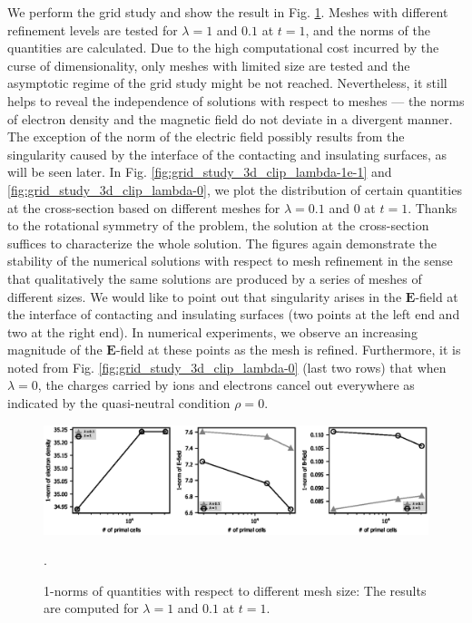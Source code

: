 \documentclass{article}
\begin{document}
We perform the grid study and show the result in Fig. \ref{fig:grid_study_3d}. Meshes with different refinement levels are tested for $\lambda = 1$ and $0.1$ at $t = 1$, and the norms of the quantities are calculated. Due to the high computational cost incurred by the curse of dimensionality, only meshes with limited size are tested and the asymptotic regime of the grid study might be not reached. Nevertheless, it still helps to reveal the independence of solutions with respect to meshes --- the norms of electron density and the magnetic field do not deviate in a divergent manner. The exception of the norm of the electric field possibly results from the singularity caused by the interface of the contacting and insulating surfaces, as will be seen later. 
In Fig. \ref{fig:grid_study_3d_clip_lambda-1e-1} and \ref{fig:grid_study_3d_clip_lambda-0}, we plot the distribution of certain quantities at the cross-section based on different meshes for $\lambda = 0.1$ and $0$ at $t = 1$. Thanks to the rotational symmetry of the problem, the solution at the cross-section suffices to characterize the whole solution. The figures again demonstrate the stability of the numerical solutions with respect to mesh refinement in the sense that qualitatively the same solutions are produced by a series of meshes of different sizes. We would like to point out that singularity arises in the $\mathbf{E}$-field at the interface of contacting and insulating surfaces (two points at the left end and two at the right end). In numerical experiments, we observe an increasing magnitude of the $\mathbf{E}$-field at these points as the mesh is refined. Furthermore, it is noted from Fig. \ref{fig:grid_study_3d_clip_lambda-0} (last two rows) that when $\lambda = 0$, the charges carried by ions and electrons cancel out everywhere as indicated by the quasi-neutral condition $\rho = 0$.

\begin{figure}
    \centering
    \includegraphics[scale=0.9]{norm_vs_nCell-T_1.eps}
    \caption{1-norms of quantities with respect to different mesh size: The results are computed for $\lambda = 1$ and $0.1$ at $t = 1$.}.
    \label{fig:grid_study_3d}
\end{figure}
\end{document}
